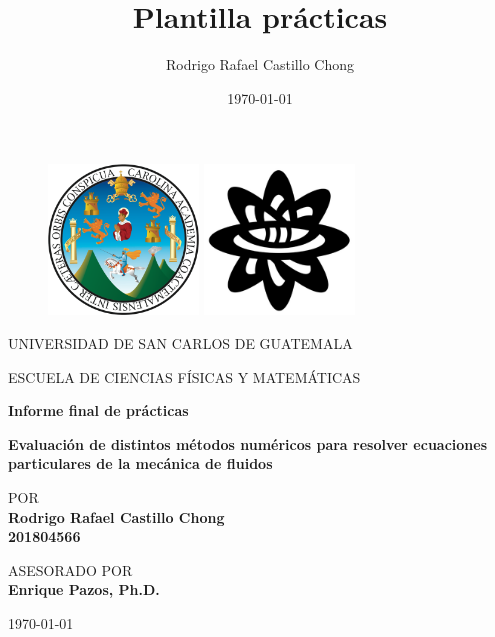 \documentclass[12pt]{article}
\title{Plantilla prácticas}
\author{Rodrigo Rafael Castillo Chong}
\date{\today}
\begin{document}
\lstset{inputencoding=utf8/latin1}
\lstset{style=myStyle}
	\thispagestyle{empty}
	
	\begin{figure}[ht]
		\includegraphics[width=4cm]{images/usaclogo.png}
		\label{EscudoUSAC}
		\endminipage
		\includegraphics[height = 4cm ,width=4cm]{images/logoecfmplain.png}
		\label{EscudoECFM}
		\endminipage
	\end{figure}
	
	\begin{center}
		\vspace{0.8cm}
		\LARGE
		UNIVERSIDAD DE SAN CARLOS DE GUATEMALA
		
		\vspace{0.8cm}
		\LARGE
		ESCUELA DE CIENCIAS FÍSICAS Y MATEMÁTICAS
		
		\vspace{1.7cm}	
		\Large
		\textbf{Informe final de prácticas}
		
		\vspace{1.7cm}
		\Large
		\textbf{Evaluación de distintos métodos numéricos para resolver ecuaciones particulares de la mecánica de fluidos}
		
		
		\vspace{1.3cm}
		\normalsize	
		POR \\
		\vspace{.3cm}
		\large
		\textbf{Rodrigo Rafael Castillo Chong \\ 201804566}
		
		\vspace{1.3cm}
		\normalsize	
		ASESORADO POR \\
		\vspace{.3cm}
		\large
		\textbf{Enrique Pazos, Ph.D.}
		
		
		
		\vspace{1.3cm}
		\today
	\end{center}
	
\end{document}
